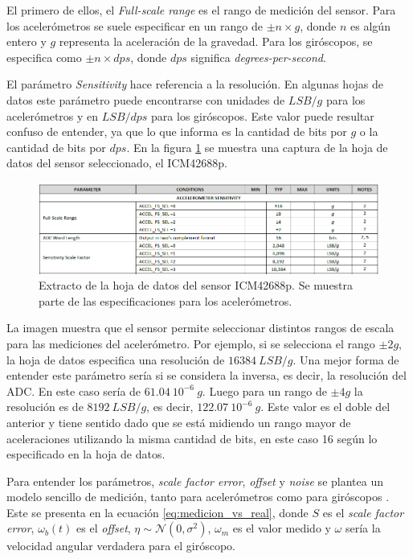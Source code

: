 El primero de ellos, el \textit{Full-scale range} es el rango de medición del sensor. Para los acelerómetros se suele especificar en un rango de $\pm n \times g$, donde $n$ es algún entero y $g$ representa la aceleración de la gravedad. Para los giróscopos, se especifica como $\pm n \times dps$, donde $dps$ significa \textit{degrees-per-second}.

El parámetro \textit{Sensitivity} hace referencia a la resolución. En algunas hojas de datos este parámetro puede encontrarse con unidades de $LSB/g$ para los acelerómetros y en $LSB/dps$ para los giróscopos. Este valor puede resultar confuso de entender, ya que lo que informa es la cantidad de bits por $g$ o la cantidad de bits por $dps$. En la figura \ref{fig:ICM_42688_datasheet} se muestra una captura de la hoja de datos del sensor seleccionado, el ICM42688p. 

\begin{figure}[htb]
    \centering
    \includegraphics[width=\textwidth]{img/ICM_42688_datasheet.png}
    \caption{Extracto de la hoja de datos del sensor ICM42688p. Se muestra parte de las especificaciones para los acelerómetros.}
    \label{fig:ICM_42688_datasheet}    
\end{figure}

La imagen muestra que el sensor permite seleccionar distintos rangos de escala para las mediciones del acelerómetro. Por ejemplo, si se selecciona el rango $\pm 2g$, la hoja de datos especifica una resolución de $16384 \ LSB/g$. Una mejor forma de entender este parámetro sería si se considera la inversa, es decir, la resolución del ADC. En este caso sería de $61.04 \ 10^{-6} \ g$. Luego para un rango de $\pm 4g$ la resolución es de $8192 \ LSB/g$, es decir, $122.07 \ 10^{-6} \ g$. Este valor es el doble del anterior y tiene sentido dado que se está midiendo un rango mayor de aceleraciones utilizando la misma cantidad de bits, en este caso 16 según lo especificado en la hoja de datos.

Para entender los parámetros, \textit{scale factor error}, \textit{offset} y \textit{noise} se plantea un modelo sencillo de medición, tanto para acelerómetros como para giróscopos \cite{borodacz2022review}. Este se presenta en la ecuación \eqref{eq:medicion_vs_real}, donde $S$ es el \textit{scale factor error}, $\omega_b(t)$ es el \textit{offset}, $\eta \sim \mathcal{N}(0,\sigma^2)$, $\omega_m$ es el valor medido y $\omega$ sería la velocidad angular verdadera para el giróscopo.

